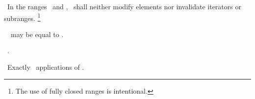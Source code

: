\documentclass[american,twoside]{book}
\begin{document}
\begin{paras}
\begin{itemdescr}
\pnum
\requires\ 
In the ranges
\
and
,
\
shall neither modify elements nor invalidate iterators or subranges.%
\footnote{The use of fully closed ranges is intentional.
}

\pnum
\notes\ 
\
may be equal to
.

\pnum
\returns\ 
.

\pnum
\complexity\ 
Exactly
\
applications of
.
\end{itemdescr}

\end{paras}



\end{document}
